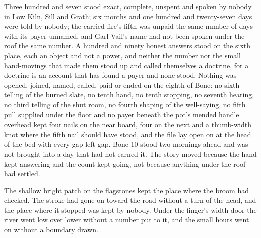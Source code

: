 Three hundred and seven stood exact, complete, unspent and spoken by nobody in Low Kiln, Sill and Grath; six months and one hundred and twenty-seven days were told by nobody; the carried fire's fifth was unpaid the same number of days with its payer unnamed, and Garl Vail's name had not been spoken under the roof the same number. A hundred and ninety honest answers stood on the sixth place, each an object and not a power, and neither the number nor the small hand-movings that made them stood up and called themselves a doctrine, for a doctrine is an account that has found a payer and none stood. Nothing was opened, joined, named, called, paid or ended on the eighth of Bone: no sixth telling of the burned slate, no tenth hand, no tenth stopping, no seventh hearing, no third telling of the shut room, no fourth shaping of the well-saying, no fifth pull supplied under the floor and no payer beneath the pot's mended handle.  overhead kept four nails on the near board, four on the next and a thumb-width knot where the fifth nail should have stood, and the file lay open on  at the head of the bed with every gap left gap. Bone 10 stood two mornings ahead and was not brought into a day that had not earned it. The story moved because the hand kept answering and the count kept going, not because anything under the roof had settled.

The shallow bright patch on the flagstones kept the place where the broom had checked. The stroke had gone on toward the road without a turn of the head, and the place where it stopped was kept by nobody. Under the finger's-width door the river went low over lower without a number put to it, and the small hours went on without a boundary drawn.
